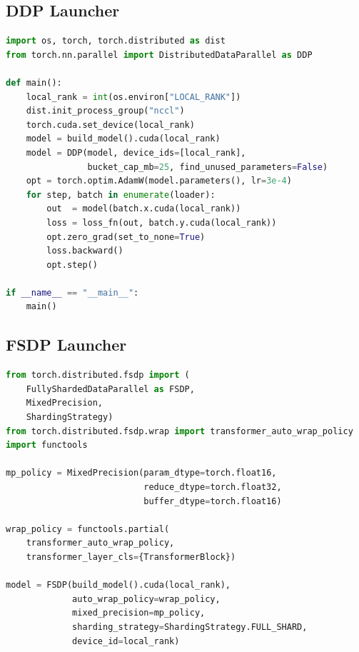 \subsection{DDP Launcher}
\begin{lstlisting}[language=Python,basicstyle=\ttfamily\scriptsize]
import os, torch, torch.distributed as dist
from torch.nn.parallel import DistributedDataParallel as DDP

def main():
    local_rank = int(os.environ["LOCAL_RANK"])
    dist.init_process_group("nccl")
    torch.cuda.set_device(local_rank)
    model = build_model().cuda(local_rank)
    model = DDP(model, device_ids=[local_rank],
                bucket_cap_mb=25, find_unused_parameters=False)
    opt = torch.optim.AdamW(model.parameters(), lr=3e-4)
    for step, batch in enumerate(loader):
        out  = model(batch.x.cuda(local_rank))
        loss = loss_fn(out, batch.y.cuda(local_rank))
        opt.zero_grad(set_to_none=True)
        loss.backward()
        opt.step()

if __name__ == "__main__":
    main()
\end{lstlisting}

\subsection{FSDP Launcher}
\begin{lstlisting}[language=Python,basicstyle=\ttfamily\scriptsize]
from torch.distributed.fsdp import (
    FullyShardedDataParallel as FSDP,
    MixedPrecision,
    ShardingStrategy)
from torch.distributed.fsdp.wrap import transformer_auto_wrap_policy
import functools

mp_policy = MixedPrecision(param_dtype=torch.float16,
                           reduce_dtype=torch.float32,
                           buffer_dtype=torch.float16)

wrap_policy = functools.partial(
    transformer_auto_wrap_policy,
    transformer_layer_cls={TransformerBlock})

model = FSDP(build_model().cuda(local_rank),
             auto_wrap_policy=wrap_policy,
             mixed_precision=mp_policy,
             sharding_strategy=ShardingStrategy.FULL_SHARD,
             device_id=local_rank)
\end{lstlisting}

